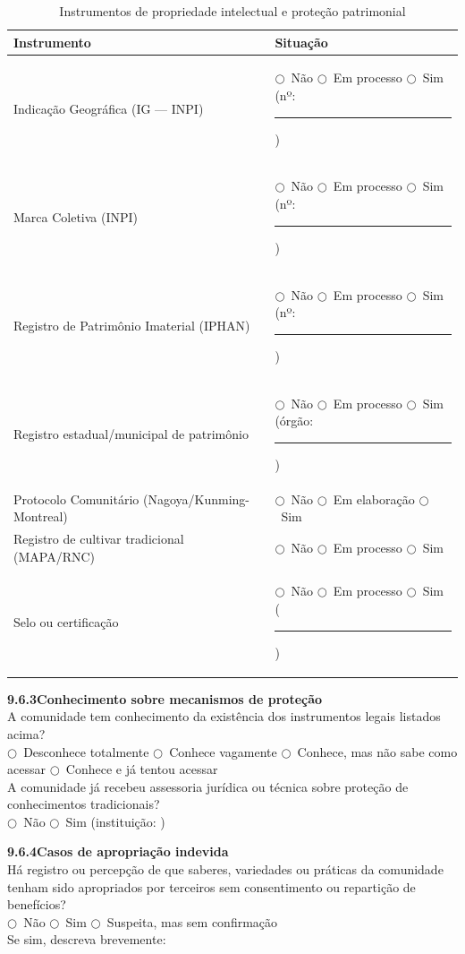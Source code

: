 \begin{table}[htbp]
\centering\small
\caption{Instrumentos de propriedade intelectual e proteção patrimonial}
\label{tab:app_pi}
\begin{tabular}{p{5.5cm}p{7cm}}
\toprule
\textbf{Instrumento} & \textbf{Situação} \\
\midrule
Indicação Geográfica (IG --- INPI) & $\bigcirc$~Não \quad $\bigcirc$~Em processo \quad $\bigcirc$~Sim (nº: \rule{1.5cm}{0.4pt}) \\
Marca Coletiva (INPI) & $\bigcirc$~Não \quad $\bigcirc$~Em processo \quad $\bigcirc$~Sim (nº: \rule{1.5cm}{0.4pt}) \\
Registro de Patrimônio Imaterial (IPHAN) & $\bigcirc$~Não \quad $\bigcirc$~Em processo \quad $\bigcirc$~Sim (nº: \rule{1.5cm}{0.4pt}) \\
Registro estadual/municipal de patrimônio & $\bigcirc$~Não \quad $\bigcirc$~Em processo \quad $\bigcirc$~Sim (órgão: \rule{1.5cm}{0.4pt}) \\
Protocolo Comunitário (Nagoya/Kunming-Montreal) & $\bigcirc$~Não \quad $\bigcirc$~Em elaboração \quad $\bigcirc$~Sim \\
Registro de cultivar tradicional (MAPA/RNC) & $\bigcirc$~Não \quad $\bigcirc$~Em processo \quad $\bigcirc$~Sim \\
Selo ou certificação & $\bigcirc$~Não \quad $\bigcirc$~Em processo \quad $\bigcirc$~Sim (\rule{2cm}{0.4pt}) \\
\bottomrule
\end{tabular}
\end{table}

\medskip\noindent\textbf{9.6.3\quad Conhecimento sobre mecanismos de proteção}\\[2pt]
A comunidade tem conhecimento da existência dos instrumentos legais listados acima?\\
$\bigcirc$~Desconhece totalmente \quad $\bigcirc$~Conhece vagamente \quad $\bigcirc$~Conhece, mas não sabe como acessar \quad $\bigcirc$~Conhece e já tentou acessar\\[4pt]
A comunidade já recebeu assessoria jurídica ou técnica sobre proteção de conhecimentos tradicionais?\\
$\bigcirc$~Não \quad $\bigcirc$~Sim (instituição: \dotfill)

\medskip\noindent\textbf{9.6.4\quad Casos de apropriação indevida}\\[2pt]
Há registro ou percepção de que saberes, variedades ou práticas da comunidade tenham sido apropriados por terceiros sem consentimento ou repartição de benefícios?\\
$\bigcirc$~Não \quad $\bigcirc$~Sim \quad $\bigcirc$~Suspeita, mas sem confirmação\\[2pt]
Se sim, descreva brevemente: \dotfill\\[2pt]\dotfill


